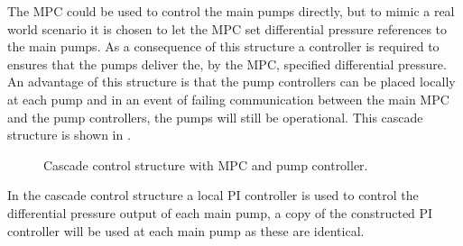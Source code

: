 The MPC could be used to control the main pumps directly, but to mimic a real world scenario it is chosen to let the MPC set differential pressure references to the main pumps. As a consequence of this structure a controller is required to ensures that the pumps deliver the, by the MPC, specified differential pressure. An advantage of this structure is that the pump controllers can be placed locally at each pump and in an event of failing communication between the main MPC and the pump controllers, the pumps will still be operational. 
This cascade structure is shown in .  
\vspace{-1mm}
\begin{figure}[H]
\centering
 
\caption{Cascade control structure with MPC and pump controller.}
\label{fig:control_structure}
\end{figure}
\vspace{-1mm}


In the cascade control structure a local PI controller is used to control the differential pressure output of each main pump, a copy of the constructed PI controller will be used at each main pump as these are identical.


